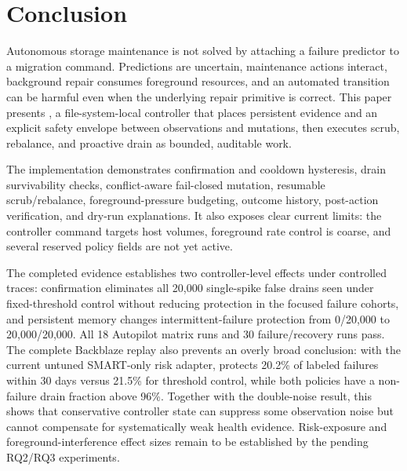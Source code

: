 \section{Conclusion}
\label{sec:conclusion}

Autonomous storage maintenance is not solved by attaching a failure predictor to a migration command. Predictions are uncertain, maintenance actions interact, background repair consumes foreground resources, and an automated transition can be harmful even when the underlying repair primitive is correct. This paper presents \autopilot{}, a file-system-local controller that places persistent evidence and an explicit safety envelope between observations and mutations, then executes scrub, rebalance, and proactive drain as bounded, auditable work.

The \argosfs{} implementation demonstrates confirmation and cooldown hysteresis, drain survivability checks, conflict-aware fail-closed mutation, resumable scrub/rebalance, foreground-pressure budgeting, outcome history, post-action verification, and dry-run explanations. It also exposes clear current limits: the controller command targets host volumes, foreground rate control is coarse, and several reserved policy fields are not yet active.

The completed evidence establishes two controller-level effects under controlled traces: confirmation eliminates all 20,000 single-spike false drains seen under fixed-threshold control without reducing protection in the focused failure cohorts, and persistent memory changes intermittent-failure protection from 0/20,000 to 20,000/20,000. All 18 Autopilot matrix runs and 30 failure/recovery runs pass. The complete Backblaze replay also prevents an overly broad conclusion: with the current untuned SMART-only risk adapter, \autopilot{} protects 20.2\% of labeled failures within 30 days versus 21.5\% for threshold control, while both policies have a non-failure drain fraction above 96\%. Together with the double-noise result, this shows that conservative controller state can suppress some observation noise but cannot compensate for systematically weak health evidence. Risk-exposure and foreground-interference effect sizes remain to be established by the pending RQ2/RQ3 experiments.
